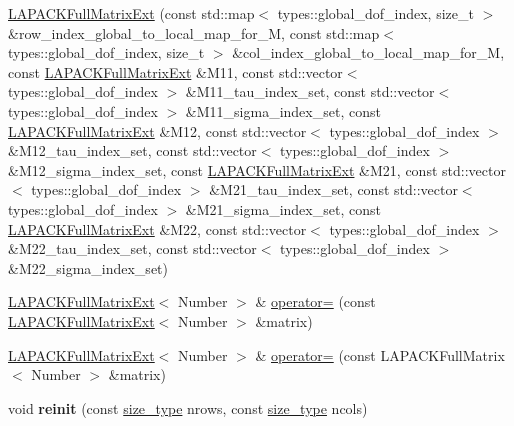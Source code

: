 \begin{DoxyCompactItemize}
\hyperlink{classLAPACKFullMatrixExt_a4baa5d6642259df28cf9f32cb6b71a25}{L\+A\+P\+A\+C\+K\+Full\+Matrix\+Ext} (const std\+::map$<$ types\+::global\+\_\+dof\+\_\+index, size\+\_\+t $>$ \&row\+\_\+index\+\_\+global\+\_\+to\+\_\+local\+\_\+map\+\_\+for\+\_\+M, const std\+::map$<$ types\+::global\+\_\+dof\+\_\+index, size\+\_\+t $>$ \&col\+\_\+index\+\_\+global\+\_\+to\+\_\+local\+\_\+map\+\_\+for\+\_\+M, const \hyperlink{classLAPACKFullMatrixExt}{L\+A\+P\+A\+C\+K\+Full\+Matrix\+Ext} \&M11, const std\+::vector$<$ types\+::global\+\_\+dof\+\_\+index $>$ \&M11\+\_\+tau\+\_\+index\+\_\+set, const std\+::vector$<$ types\+::global\+\_\+dof\+\_\+index $>$ \&M11\+\_\+sigma\+\_\+index\+\_\+set, const \hyperlink{classLAPACKFullMatrixExt}{L\+A\+P\+A\+C\+K\+Full\+Matrix\+Ext} \&M12, const std\+::vector$<$ types\+::global\+\_\+dof\+\_\+index $>$ \&M12\+\_\+tau\+\_\+index\+\_\+set, const std\+::vector$<$ types\+::global\+\_\+dof\+\_\+index $>$ \&M12\+\_\+sigma\+\_\+index\+\_\+set, const \hyperlink{classLAPACKFullMatrixExt}{L\+A\+P\+A\+C\+K\+Full\+Matrix\+Ext} \&M21, const std\+::vector$<$ types\+::global\+\_\+dof\+\_\+index $>$ \&M21\+\_\+tau\+\_\+index\+\_\+set, const std\+::vector$<$ types\+::global\+\_\+dof\+\_\+index $>$ \&M21\+\_\+sigma\+\_\+index\+\_\+set, const \hyperlink{classLAPACKFullMatrixExt}{L\+A\+P\+A\+C\+K\+Full\+Matrix\+Ext} \&M22, const std\+::vector$<$ types\+::global\+\_\+dof\+\_\+index $>$ \&M22\+\_\+tau\+\_\+index\+\_\+set, const std\+::vector$<$ types\+::global\+\_\+dof\+\_\+index $>$ \&M22\+\_\+sigma\+\_\+index\+\_\+set)
\item 
\hyperlink{classLAPACKFullMatrixExt}{L\+A\+P\+A\+C\+K\+Full\+Matrix\+Ext}$<$ Number $>$ \& \hyperlink{classLAPACKFullMatrixExt_a48a8520d322ba5be9f5bb38e67f9b01b}{operator=} (const \hyperlink{classLAPACKFullMatrixExt}{L\+A\+P\+A\+C\+K\+Full\+Matrix\+Ext}$<$ Number $>$ \&matrix)
\item 
\hyperlink{classLAPACKFullMatrixExt}{L\+A\+P\+A\+C\+K\+Full\+Matrix\+Ext}$<$ Number $>$ \& \hyperlink{classLAPACKFullMatrixExt_ae277e753101db17ebf5bbd43dd04ab27}{operator=} (const L\+A\+P\+A\+C\+K\+Full\+Matrix$<$ Number $>$ \&matrix)
\item 
\mbox{\label{classLAPACKFullMatrixExt_ae67c72d9ba641f02dc0e3b3486b95a10}} 
void {\bfseries reinit} (const \hyperlink{classLAPACKFullMatrixExt_a5cf5f4a6104dc17029210b5ca52bf574}{size\+\_\+type} nrows, const \hyperlink{classLAPACKFullMatrixExt_a5cf5f4a6104dc17029210b5ca52bf574}{size\+\_\+type} ncols)
\item 

\end{DoxyCompactItemize}
